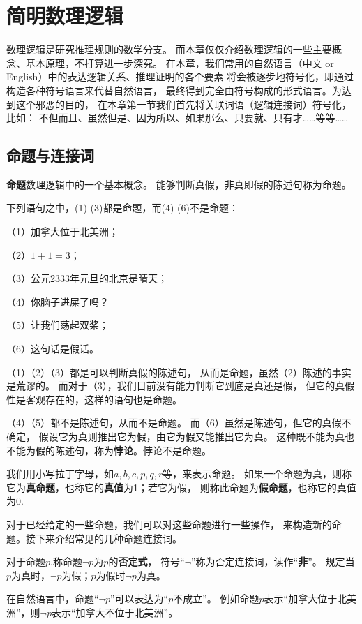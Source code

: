 \section{简明数理逻辑}

数理逻辑是研究推理规则的数学分支。
而本章仅仅介绍数理逻辑的一些主要概念、基本原理，不打算进一步深究。
在本章，我们常用的自然语言（中文 or English）中的表达逻辑关系、推理证明的各个要素
将会被逐步地符号化，即通过构造各种符号语言来代替自然语言，
最终得到完全由符号构成的形式语言。为达到这个邪恶的目的，
在本章第一节我们首先将关联词语（逻辑连接词）符号化，比如：
不但而且、虽然但是、因为所以、如果那么、只要就、只有才……等等……

\subsection{命题与连接词}
\textbf{命题}数理逻辑中的一个基本概念。
能够判断真假，非真即假的陈述句称为命题。

\begin{example}下列语句之中，(1)-(3)都是命题，而(4)-(6)不是命题：

（1）加拿大位于北美洲；

（2）$1+1=3$；

（3）公元2333年元旦的北京是晴天；

（4）你脑子进屎了吗？

（5）让我们荡起双桨；

（6）这句话是假话。\label{examples of propositions}
\end{example}

（1）（2）（3）都是可以判断真假的陈述句，
从而是命题，虽然（2）陈述的事实是荒谬的。
而对于（3），我们目前没有能力判断它到底是真还是假，
但它的真假性是客观存在的，这样的语句也是命题。

（4）（5）都不是陈述句，从而不是命题。
而（6）虽然是陈述句，但它的真假不确定，
假设它为真则推出它为假，由它为假又能推出它为真。
这种既不能为真也不能为假的陈述句，称为\textbf{悖论}。悖论不是命题。\vsp

我们用小写拉丁字母，如$a,b,c,p,q,r$等，来表示命题。
如果一个命题为真，则称它为\textbf{真命题}，也称它的\textbf{真值}为1；若它为假，
则称此命题为\textbf{假命题}，也称它的真值为0.\vsp

对于已经给定的一些命题，我们可以对这些命题进行一些操作，
来构造新的命题。接下来介绍常见的几种命题连接词。

\begin{definition}[否定连接词]
对于命题$p$,称命题$\neg p$为$p$的\textbf{否定式}，
符号“$\neg$”称为否定连接词，读作“\textbf{非}”。
规定当$p$为真时，$\neg p$为假；$p$为假时$\neg p$为真。
\end{definition}
在自然语言中，命题“$\neg p$”可以表达为“$p$不成立”。
例如命题$p$表示“加拿大位于北美洲”，则$\neg p$表示“加拿大不位于北美洲”。

